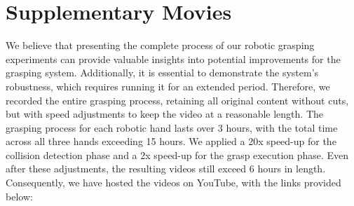\section*{\Large \textbf{Supplementary Movies}}
We believe that presenting the complete process of our robotic grasping experiments can provide valuable insights into potential improvements for the grasping system. Additionally, it is essential to demonstrate the system’s robustness, which requires running it for an extended period. Therefore, we recorded the entire grasping process, retaining all original content without cuts, but with speed adjustments to keep the video at a reasonable length. The grasping process for each robotic hand lasts over 3 hours, with the total time across all three hands exceeding 15 hours. We applied a 20x speed-up for the collision detection phase and a 2x speed-up for the grasp execution phase. Even after these adjustments, the resulting videos still exceed 6 hours in length. Consequently, we have hosted the videos on YouTube, with the links provided below:
